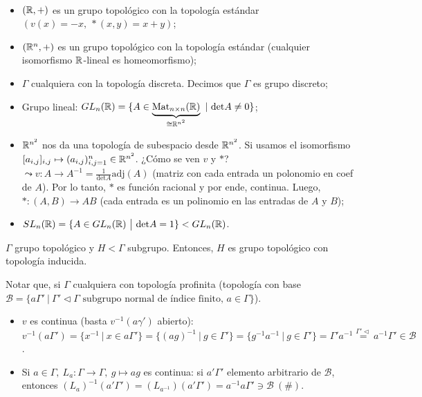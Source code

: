 \begin{eg}~
	\begin{itemize}
		\item $(\mathbb{R},+)$ es un grupo topológico con la topología estándar $(v(x) = -x,\ *(x,y) = x + y)$;

		\item $(\mathbb{R}^n,+)$ es un grupo topológico con la topología estándar (cualquier isomorfismo $\mathbb{R}$-lineal es homeomorfismo);

		\item $\Gamma $ cualquiera con la topología discreta. Decimos que $\Gamma $ es grupo discreto;

		\item Grupo lineal: ${GL}_{n}(\R) = \{A \in \underbrace{\text{Mat}_{n \times n}(\R)}_{\cong \R^{n^2}} \ | \ \text{det}A \neq 0 \}$;

		\item $\mathbb{R}^{n^2}$ nos da una topología de subespacio desde $\mathbb{R}^{n^2}$. Si usamos el isomorfismo $[a_{i,j}]_{i,j} \mapsto (a_{i,j})_{i,j=1}^{n} \in \mathbb{R}^{n^2}$. ¿Cómo se ven $v$ y $*$? $\leadsto v:A \to A^{-1} = \frac{1}{\text{det}A}\text{adj}(A)$ (matriz con cada entrada un polonomio en coef de $A$). Por lo tanto, $*$ es función racional y por ende, continua. Luego, $*:(A,B) \to AB$ (cada entrada es un polinomio en las entradas de $A$ y $B$);

		\item ${SL}_{n}(\R) = \{A \in {GL}_{n}(\R) \ \big| \ \text{det}A = 1\} < {GL}_{n}(\R)$.
	\end{itemize}
\end{eg}

\begin{property}
	$\Gamma$ grupo topológico y $H < \Gamma $ subgrupo. Entonces, $H$ es grupo topológico con topología inducida.
\end{property}

\noindent Notar que, si $\Gamma $ cualquiera con topología profinita (topología con base $\mathcal{B} = \{a \Gamma' \ \big| \ \Gamma' \lhd \Gamma \text{ subgrupo normal de índice finito, } a \in \Gamma \}$).
\begin{itemize}
	\item $v$ es continua (basta $v^{-1}(a \gamma')$ abierto): $v^{-1}(a \Gamma') = \{x^{-1} \ \big| \ x \in a \Gamma' \} = \{(ag)^{-1} \ \big| \ g \in \Gamma' \} = \{ g^{-1} a^{-1} \ \big| \ g \in \Gamma' \} = \Gamma' a^{-1} \stackrel{\Gamma' \lhd}{=} a^{-1} \Gamma' \in \mathcal{B}$. 

	\item Si $a \in \Gamma,\ L_a : \Gamma \to \Gamma,\ g \mapsto ag$ es continua: si $a'\Gamma'$ elemento arbitrario de $\mathcal{B}$, entonces $(L_a)^{-1}(a'\Gamma') = (L_{a^{-1}})(a'\Gamma') = a^{-1} a \Gamma' \ni \mathcal{B}\ (\#)$.
\end{itemize}

